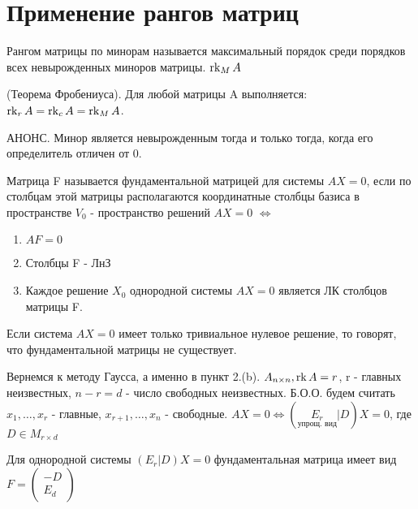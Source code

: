 \section{Применение рангов матриц}
\begin{definition}
	Рангом матрицы по минорам называется максимальный порядок среди порядков всех невырожденных миноров матрицы. \(\operatorname{rk}_MA\)
\end{definition}
\begin{theorem}
	(Теорема Фробениуса). \newline
	Для любой матрицы A выполняется: \(\operatorname{rk}_rA=\operatorname{rk}_cA = \operatorname{rk}_MA\).
\end{theorem}
АНОНС. Минор является невырожденным тогда и только тогда, когда его определитель отличен от 0.\newline
\begin{definition}
	Матрица F называется фундаментальной матрицей для системы \(AX=0\), если по столбцам этой матрицы располагаются координатные столбцы базиса в пространстве \(V_0\) - пространство решений \(AX=0\) $\Longleftrightarrow$
	\begin{enumerate}
		\item \(AF = 0\)
		\item Столбцы F - ЛнЗ
		\item Каждое решение \(X_0\) однородной системы \(AX=0\) является ЛК столбцов матрицы F.
	\end{enumerate}
	Если система \(AX=0\) имеет только тривиальное нулевое решение, то говорят, что фундаментальной матрицы не существует.
\end{definition}
Вернемся к методу Гаусса, а именно в пункт 2.(b). \(A_{n\times n}, \operatorname{rk} A = r\), r - главных неизвестных, \(n-r=d\) - число свободных неизвестных. Б.О.О. будем считать \(x_1, \ldots, x_r\) - главные, \(x_{r+1}, \ldots, x_n\) - свободные. \newline
\(AX = 0 \Longleftrightarrow (\underset{\text{упрощ. вид}}{E_r}|D)X = 0\), где \(D\in M_{r\times d}\)
\begin{theorem}
	Для однородной системы \((E_r|D)X=0\) фундаментальная матрица имеет вид \(F = \begin{pmatrix}
	-D \\ E_d
	\end{pmatrix}\)
\end{theorem}
